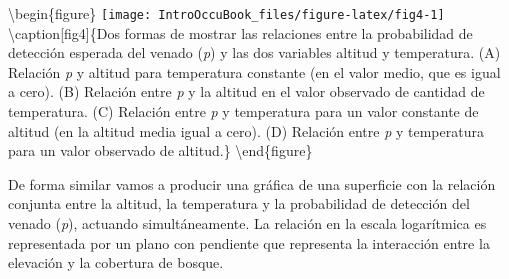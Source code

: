 \documentclass[
]{book}
\begin{document}
\textbackslash begin\{figure\}
\texttt{[image: IntroOccuBook\_files/figure-latex/fig4-1]} \textbackslash caption{[}fig4{]}\{Dos formas de mostrar las relaciones entre la probabilidad de detección esperada del venado (\emph{p}) y las dos variables altitud y temperatura. (A) Relación \emph{p} y altitud para temperatura constante (en el valor medio, que es igual a cero). (B) Relación entre \emph{p} y la altitud en el valor observado de cantidad de temperatura. (C) Relación entre \emph{p} y temperatura para un valor constante de altitud (en la altitud media igual a cero). (D) Relación entre \emph{p} y temperatura para un valor observado de altitud.\}\label{fig:fig4}
\textbackslash end\{figure\}

De forma similar vamos a producir una gráfica de una superficie con la relación conjunta entre la altitud, la temperatura y la probabilidad de detección del venado (\emph{p}), actuando simultáneamente. La relación en la escala logarítmica es representada por un plano con pendiente que representa la interacción entre la elevación y la cobertura de bosque.
\end{document}

